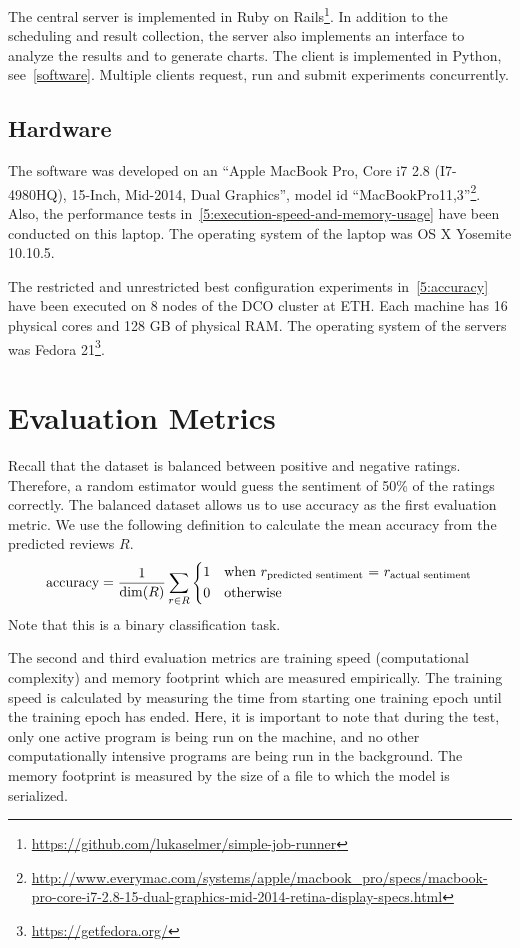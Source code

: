 The central server is implemented in Ruby on Rails\footnote{\url{https://github.com/lukaselmer/simple-job-runner}}. In addition to the scheduling and result collection, the server also implements an interface to analyze the results and to generate charts. The client is implemented in Python, see~\ref{software}. Multiple clients request, run and submit experiments concurrently.

\subsection{Hardware}\label{hardware}

The software was developed on an ``Apple MacBook Pro, Core i7 2.8 (I7-4980HQ), 15-Inch, Mid-2014, Dual Graphics'', model id ``MacBookPro11,3''\footnote{\url{http://www.everymac.com/systems/apple/macbook_pro/specs/macbook-pro-core-i7-2.8-15-dual-graphics-mid-2014-retina-display-specs.html}}. Also, the performance tests in~\ref{5:execution-speed-and-memory-usage} have been conducted on this laptop. The operating system of the laptop was OS X Yosemite 10.10.5.

The restricted and unrestricted best configuration experiments in~\ref{5:accuracy} have been executed on 8 nodes of the DCO cluster at ETH\@. Each machine has 16 physical cores and 128 GB of physical RAM\@. The operating system of the servers was Fedora 21\footnote{\url{https://getfedora.org/}}.

\section{Evaluation Metrics}\label{evaluation-metrics}

Recall that the dataset is balanced between positive and negative ratings. Therefore, a random estimator would guess the sentiment of 50\% of the ratings correctly. The balanced dataset allows us to use accuracy as the first evaluation metric. We use the following definition to calculate the mean accuracy from the predicted reviews $R$.
\begin{displaymath}
\text{accuracy} = \frac{1}{\dim(R)} \sum_{r \in R} \begin{dcases*}
1& when $r_{\text{predicted sentiment}}$ = $r_{\text{actual sentiment}}$\\
0& otherwise
\end{dcases*}
\end{displaymath}
Note that this is a binary classification task.

The second and third evaluation metrics are training speed (computational complexity) and memory footprint which are measured empirically. The training speed is calculated by measuring the time from starting one training epoch until the training epoch has ended. Here, it is important to note that during the test, only one active program is being run on the machine, and no other computationally intensive programs are being run in the background. The memory footprint is measured by the size of a file to which the model is serialized.

